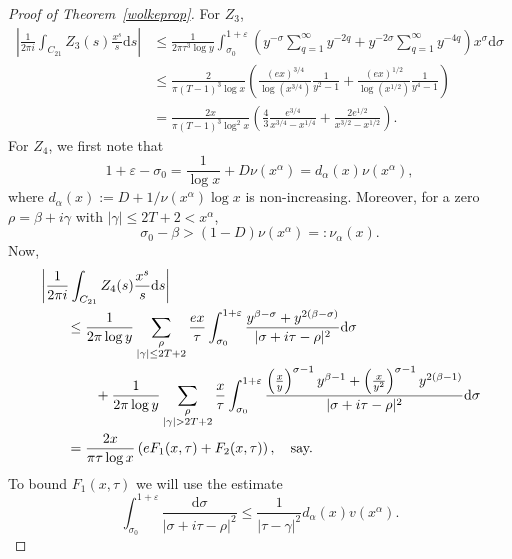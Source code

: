 \documentclass[reqno]{amsart}
\numberwithin{equation}{section}
\theoremstyle{remark}
\begin{document}
\begin{proof}[Proof of Theorem~\ref{wolkeprop}]
For $Z_3$,
\begin{align*}
    \left|\frac{1}{2\pi i}\int_{C_{21}}Z_3(s)\frac{x^s}{s}\mathrm{d}s\right|&\leq\frac{1}{2\pi\tau^3\log y}\int_{\sigma_0}^{1+\varepsilon}\left(y^{-\sigma}\sum_{q=1}^\infty y^{-2q}+y^{-2\sigma}\sum_{q=1}^\infty y^{-4q}\right)x^{\sigma}\mathrm{d}\sigma\\
    &\leq\frac{2}{\pi(T-1)^3\log x}\left(\frac{(ex)^{3/4}}{\log (x^{3/4})}\frac{1}{y^2-1}+\frac{(ex)^{1/2}}{\log(x^{1/2})}\frac{1}{y^4-1}\right)\\
    &=\frac{2x}{\pi (T-1)^3\log ^2x}\left(\frac{4}{3}\frac{e^{3/4}}{x^{3/4}-x^{1/4}}+\frac{2e^{1/2}}{x^{3/2}-x^{1/2}}\right).
\end{align*}
For $Z_4$, we first note that
\begin{equation}\label{terminaleq}
    1+\varepsilon-\sigma_0=\frac{1}{\log x}+D\nu(x^{\alpha})=d_{\alpha}(x)\nu(x^{\alpha}),
\end{equation}
where $d_{\alpha}(x):=D+1/\nu(x^{\alpha})\log x$ is non-increasing. Moreover, for a zero $\rho=\beta+i\gamma$ with $|\gamma|\leq 2T+2<x^\alpha$,
\begin{equation}\label{betasigmaeq}
    \sigma_0-\beta>(1-D)\nu(x^{\alpha})=:\nu_{\alpha}(x).
\end{equation}
Now,
\begin{align}
    &\left|\frac{1}{2\pi i}\int_{C_{21}}Z_4(s)\frac{x^s}{s} \mathrm{d}s\right|\\
    &\qquad\leq\frac{1}{2\pi\log y}\sum_{\substack{\rho\\|\gamma|\leq2T+2}}\frac{ex}{\tau}\int_{\sigma_0}^{1+\varepsilon}\frac{y^{\beta-\sigma}+y^{2(\beta-\sigma)}}{|\sigma+i\tau-\rho|^2}\mathrm{d}\sigma\notag\\
    &\qquad\qquad+\frac{1}{2\pi\log y}\sum_{\substack{\rho\\|\gamma|>2T+2}}\frac{x}{\tau}\int_{\sigma_0}^{1+\varepsilon}\frac{\left(\frac{x}{y}\right)^{\sigma-1}y^{\beta-1}+\left(\frac{x}{y^2}\right)^{\sigma-1}y^{2(\beta-1)}}{|\sigma+i\tau-\rho|^2}\mathrm{d}\sigma\notag\\
    &\qquad=\frac{2x}{\pi\tau\log x}\left(eF_1(x,\tau)+F_2(x,\tau)\right),\quad\text{say.}\label{z4inteq}
\end{align}
To bound $F_1(x,\tau)$ we will use the estimate
\begin{equation}\label{f1est1}
    \int_{\sigma_0}^{1+\varepsilon}\frac{\mathrm{d}\sigma}{|\sigma+i\tau-\rho|^2}\leq\frac{1}{|\tau-\gamma|^2}d_{\alpha}(x)v(x^\alpha). 
\end{equation}

\end{proof}
\end{document}

